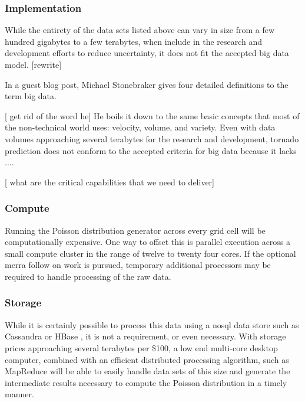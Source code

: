 \subsubsection{Implementation}
While the entirety of the data sets listed above can vary in size from a few hundred gigabytes to a few terabytes, when include in the research and development efforts to reduce uncertainty, it does not fit the accepted big data model. [rewrite]



In a guest blog post, Michael Stonebraker gives four detailed definitions to the term big data\cite{stonebraker}. 

[ get rid of the word he]
He boils it down to the same basic concepts that most of the non-technical world uses: velocity, volume, and variety. Even with data volumes approaching several terabytes for the research and development, tornado prediction does not conform to the accepted criteria for big data because it lacks ....

[ what are the critical capabilities that we need to deliver]

\subsubsection{Compute}
Running the Poisson distribution generator across every grid cell will be computationally expensive. One way to offset this is parallel execution across a small compute cluster in the range of twelve to twenty four cores. If the optional \gls{merra} follow on work is pursued, temporary additional processors may be required to handle processing of the raw data.
\subsubsection{Storage}
While it is certainly possible to process this data using a \gls{nosql} data store such as Cassandra \cite{cassandra} or HBase \cite{Hbase}, it is not a requirement, or even necessary. With storage prices approaching several terabytes per \$100, a low end multi-core desktop computer, combined with an efficient distributed processing algorithm, such as MapReduce \cite{mapreduce} will be able to easily handle data sets of this size and generate the intermediate results necessary to compute the Poisson distribution in a timely manner.\\

